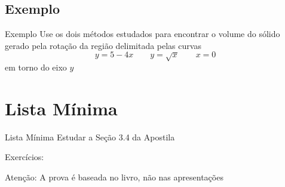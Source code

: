 \documentclass[fleqn,utf8,aspectratio=169,12pt]{beamer}
\begin{document}
\addtocounter{exemplo}{1}
\subsection{Exemplo \theexemplo}

\begin{frame}{Exemplo \theexemplo{}}
  Use os dois métodos estudados para encontrar o volume do sólido
  gerado pela rotação da região delimitada pelas curvas
  \[
    y = 5-4x
    \qquad
    y = \sqrt{x}
    \qquad
    x = 0
  \]
  em torno do eixo $y$
\end{frame}


%
%


\section{Lista Mínima}

\begin{frame}{Lista Mínima}
  Estudar a Seção 3.4 da Apostila

  Exercícios:

  \vfill
  Atenção: A prova é baseada no livro, não nas apresentações
\end{frame}

\end{document}
